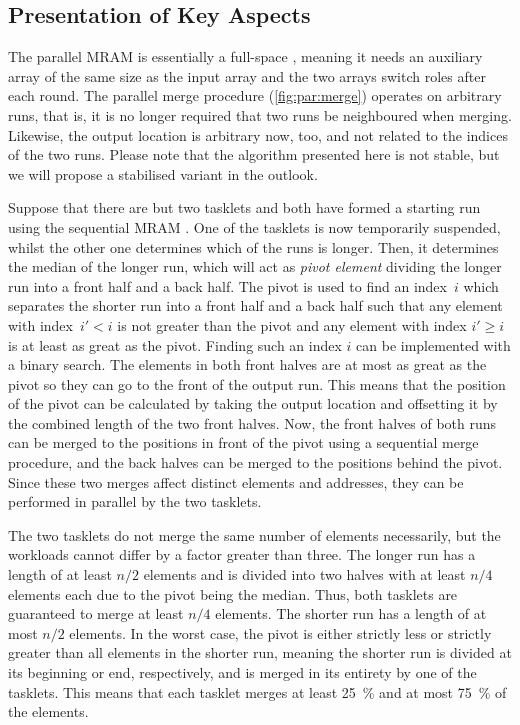 \subsection{Presentation of Key Aspects}
\label{sec:mram:par:aspects}

The parallel \ac{MRAM} \MS{} is essentially a full-space \MS{}, meaning it needs an auxiliary array of the same size as the input array and the two arrays switch roles after each round.
The parallel merge procedure (\cref{fig:par:merge}) operates on arbitrary runs, that is, it is no longer required that two runs be neighboured when merging.
Likewise, the output location is arbitrary now, too, and not related to the indices of the two runs.
Please note that the algorithm presented here is not stable, but we will propose a stabilised variant in the outlook.

Suppose that there are but two tasklets and both have formed a starting run using the sequential \ac{MRAM} \MS{}.
One of the tasklets is now temporarily suspended, whilst the other one determines which of the runs is longer.
Then, it determines the median of the longer run, which will act as \emph{pivot element} dividing the longer run into a front half and a back half.
The pivot is used to find an index~\(i\) which separates the shorter run into a front half and a back half such that any element with index~\(i' < i\) is not greater than the pivot and any element with index \(i' \ge i\) is at least as great as the pivot.
Finding such an index \(i\) can be implemented with a binary search.
The elements in both front halves are at most as great as the pivot so they can go to the front of the output run.
This means that the position of the pivot can be calculated by taking the output location and offsetting it by the combined length of the two front halves.
Now, the front halves of both runs can be merged to the positions in front of the pivot using a sequential merge procedure, and the back halves can be merged to the positions behind the pivot.
Since these two merges affect distinct elements and addresses, they can be performed in parallel by the two tasklets.

The two tasklets do not merge the same number of elements necessarily, but the workloads cannot differ by a factor greater than three.
The longer run has a length of at least \(n/2\) elements and is divided into two halves with at least \(n/4\) elements each due to the pivot being the median.
Thus, both tasklets are guaranteed to merge at least \(n/4\) elements.
The shorter run has a length of at most \(n/2\) elements.
In the worst case, the pivot is either strictly less or strictly greater than all elements in the shorter run, meaning the shorter run is divided at its beginning or end, respectively, and is merged in its entirety by one of the tasklets.
This means that each tasklet merges at least \qty{25}{\percent} and at most \qty{75}{\percent} of the elements.

